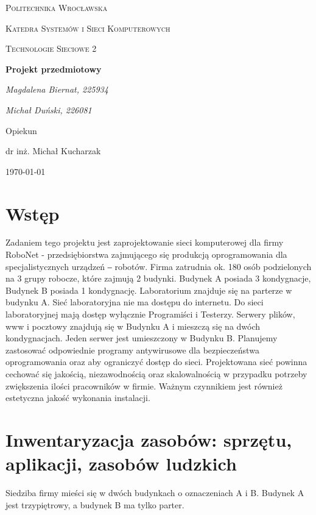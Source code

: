 \documentclass{article}
\begin{document}
	
	\begin{titlepage}
		\centering
		{\scshape\LARGE Politechnika Wrocławska \par}
		{\scshape\Large Katedra Systemów i Sieci Komputerowych \par}
		
		\vspace{1cm}
		{\scshape\Large Technologie Sieciowe 2\par}
		\vspace{5cm}
		{\huge\bfseries Projekt przedmiotowy\par}
		\vspace{5cm}
		{\Large\itshape Magdalena Biernat, 225934\par}
		{\Large\itshape Michał Duński, 226081\par}
		\vfill
		Opiekun\par
		dr inż. Michał Kucharzak 
		
		\vfill
		{\large \today\par}
	\end{titlepage}
	\newpage
	\section{Wstęp}
	 Zadaniem tego projektu jest zaprojektowanie sieci komputerowej dla firmy RoboNet - przedsiębiorstwa zajmującego się produkcją oprogramowania dla specjalistycznych urządzeń ‒ robotów. Firma zatrudnia ok. 180 osób podzielonych na 3 grupy robocze, które zajmują 2 budynki. Budynek A posiada 3 kondygnacje, Budynek B posiada 1 kondygnację. Laboratorium znajduje się na parterze w budynku A. Sieć laboratoryjna nie ma dostępu do internetu. Do sieci laboratoryjnej mają dostęp wyłącznie Programiści i Testerzy. Serwery plików, www i pocztowy znajdują się w Budynku A i mieszczą się na dwóch kondygnacjach. Jeden serwer jest umieszczony w Budynku B.\newline
	 \noindent
	 \newline
Planujemy zastosować odpowiednie programy antywirusowe dla bezpieczeństwa oprogramowania oraz aby ograniczyć dostęp do sieci.
\newline
\noindent
\newline
	Projektowana sieć powinna cechować się jakością, niezawodnością oraz skalowalnością w przypadku potrzeby zwiększenia ilości pracowników w firmie. Ważnym czynnikiem jest również estetyczna jakość wykonania instalacji.
\newpage
\section{Inwentaryzacja zasobów: sprzętu, aplikacji, zasobów ludzkich}
Siedziba firmy mieści się w dwóch budynkach o oznaczeniach A i B. Budynek A jest trzypiętrowy, a budynek B ma tylko parter. 
\end{document}
